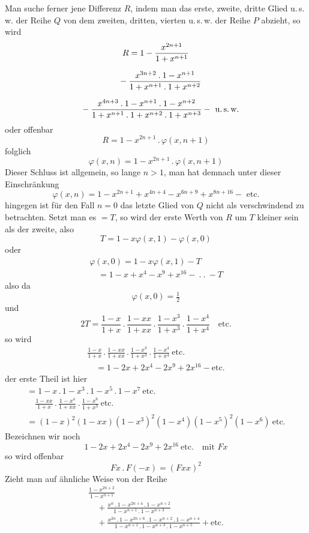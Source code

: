 Man suche ferner jene Differenz $R$, indem man das erste, zweite, dritte 
Glied u.\,s.\,w. der Reihe $Q$ von dem zweiten, dritten, vierten u.\,s.\,w. der Reihe 
$P$ abzieht, so wird
\[
\begin{gathered}R=1-\frac{x^{2n+1}}{1+x^{n+1}}
\\[7pt]\quad{}-\frac{x^{3n+2}\mathbin{.}1-x^{n+1}}{1+x^{n+1}\mathbin{.}1+x^{n+2}}
\\[7pt]\quad{}-\frac{x^{4n+3}\mathbin{.}1-x^{n+1}\mathbin{.}1-x^{n+2}}{1+x^{n+1}\mathbin{.}1+x^{n+2}\mathbin{.}1+x^{n+3}}
-\text{ u.\,s.\,w.}\end{gathered}
\]
oder offenbar
\[
R=1-x^{2n+1}\mathbin{.}\varphi(x,n+1)
\]
folglich
\[
\varphi(x,n)=1-x^{2n+1}\mathbin{.}\varphi(x,n+1)
\]
Dieser Schluss ist allgemein, so lange $n>1$, man hat demnach unter dieser Einschränkung
\[
\varphi(x,n)=1-x^{2n+1}+x^{4n+4}-x^{6n+9}+x^{8n+16}-\text{ etc.}
\]
hingegen ist für den Fall $n=0$ das letzte Glied von $Q$ nicht als verschwindend zu betrachten. Setzt man es $=T$, so wird der erste Werth von $R$ um 
$T$ kleiner sein als der zweite, also
\[
T=1-x\varphi(x,1)-\varphi(x,0)
\]
oder
\[
\begin{gathered}\varphi(x,0)=1-x\varphi(x,1)-T\\[7pt]\quad{}=1-x+x^4-x^9+x^{16}-\ .\ .\ -T\end{gathered}
\]
also da
\[
\varphi(x,0)=\tfrac12
\]
und
\[
2T=\frac{1-x}{1+x}\mathbin{.}\frac{1-xx}{1+xx}\mathbin{.}\frac{1-x^3}{1+x^3}\mathbin{.}\frac{1-x^4}{1+x^4}\quad\text{etc.}
\]
so wird
\[
\begin{gathered}\frac{1-x}{1+x}\,.\,\frac{1-xx}{1+xx}\,.\,\frac{1-x^3}{1+x^3}\,.\,\frac{1-x^4}{1+x^4}\ \text{etc.}
\\[7pt]\quad{}=1-2x+2x^4-2x^9+2x^{16}-\text{etc.}\end{gathered}
\]
der erste Theil ist hier
\[
\begin{gathered}
=1-x\,.\,1-x^3\,.\,1-x^5\,.\,1-x^7\ \text{etc.}\quad
\\[7pt]\quad{}\frac{1-xx}{1+x}\,.\,\frac{1-x^4}{1+xx}\,.\,\frac{1-x^6}{1+x^3}\ \text{etc.}\\[7pt]
=(1-x)^2(1-xx)(1-x^3)^2(1-x^4)(1-x^5)^2(1-x^6)\ \text{etc.}
\end{gathered}
\]
Bezeichnen wir noch
\[
1-2x+2x^4-2x^9+2x^{16}\ \text{etc.}\quad\text{mit }Fx
\]
so wird offenbar
\[
Fx\,.\,F(-x)=(Fxx)^2
\]
Zieht man auf ähnliche Weise von der Reihe
\[
\begin{gathered}\frac{1-x^{2n+2}}{1-x^{n+1}}
\\[7pt]\quad{}+\frac{x^n\,.\,1-x^{2n+4}\,.\,1-x^{n+2}}{1-x^{n+1}\,.\,1-x^{n+3}}
\\[7pt]\quad{}+\frac{x^{2n}\,.\,1-x^{2n+6}\,.\,1-x^{n+2}\,.\,1-x^{n+4}}{1-x^{n+1}\,.\,1-x^{n+3}\,.\,1-x^{n+5}}
+\text{etc.}\end{gathered}
\]
